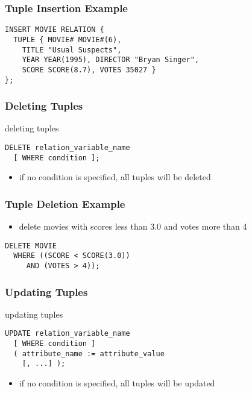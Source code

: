 \documentclass[dvipsnames]{beamer}
\theoremstyle{plain}
\begin{document}
\begin{frame}[fragile]
  \frametitle{Tuple Insertion Example}

  \begin{example}
    \begin{lstlisting}
INSERT MOVIE RELATION {
  TUPLE { MOVIE# MOVIE#(6),
    TITLE "Usual Suspects",
    YEAR YEAR(1995), DIRECTOR "Bryan Singer",
    SCORE SCORE(8.7), VOTES 35027 }
};
    \end{lstlisting}
  \end{example}
\end{frame}

\begin{frame}[fragile]
  \frametitle{Deleting Tuples}

  \begin{block}{deleting tuples}
    \begin{lstlisting}
DELETE relation_variable_name
  [ WHERE condition ];
    \end{lstlisting}
  \end{block}

  \pause
  \begin{itemize}
    \item if no condition is specified, all tuples will be deleted
  \end{itemize}
\end{frame}

\begin{frame}[fragile]
  \frametitle{Tuple Deletion Example}

  \begin{example}
    \begin{itemize}
      \item delete movies with scores less than 3.0 and votes more than 4
    \end{itemize}

    \begin{lstlisting}
DELETE MOVIE
  WHERE ((SCORE < SCORE(3.0))
     AND (VOTES > 4));
    \end{lstlisting}
  \end{example}
\end{frame}

\begin{frame}[fragile]
  \frametitle{Updating Tuples}

  \begin{block}{updating tuples}
    \begin{lstlisting}
UPDATE relation_variable_name
  [ WHERE condition ]
  ( attribute_name := attribute_value
    [, ...] );
    \end{lstlisting}
  \end{block}

  \pause
  \begin{itemize}
    \item if no condition is specified, all tuples will be updated
  \end{itemize}
\end{frame}
\end{document}
